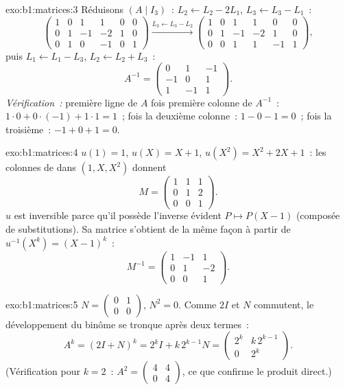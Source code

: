 \begin{solution}{exo:b1:matrices:3}
Réduisons $(A \mid I_3)$~: $L_2 \leftarrow L_2 - 2L_1$, $L_3
\leftarrow L_3 - L_1$~:
\[
\begin{pmatrix}
1 & 0 & 1 & 1 & 0 & 0\\
0 & 1 & -1 & -2 & 1 & 0\\
0 & 1 & 0 & -1 & 0 & 1
\end{pmatrix}
\xrightarrow{L_3 \leftarrow L_3 - L_2}
\begin{pmatrix}
1 & 0 & 1 & 1 & 0 & 0\\
0 & 1 & -1 & -2 & 1 & 0\\
0 & 0 & 1 & 1 & -1 & 1
\end{pmatrix},
\]
puis $L_1 \leftarrow L_1 - L_3$, $L_2 \leftarrow L_2 + L_3$~:
\[
A^{-1} = \begin{pmatrix}
0 & 1 & -1\\
-1 & 0 & 1\\
1 & -1 & 1
\end{pmatrix}.
\]
\emph{Vérification~:} première ligne de $A$ fois première colonne de
$A^{-1}$~: $1 \cdot 0 + 0\cdot(-1) + 1\cdot 1 = 1$~; fois la deuxième
colonne~: $1 - 0 - 1 = 0$~; fois la troisième~: $-1 + 0 + 1 = 0$.
\end{solution}

\begin{solution}{exo:b1:matrices:4}
$u(1) = 1$, $u(X) = X + 1$, $u(X^2) = X^2 + 2X + 1$~: les colonnes de
 dans $(1, X, X^2)$ donnent
\[
M = \begin{pmatrix}
1 & 1 & 1\\
0 & 1 & 2\\
0 & 0 & 1
\end{pmatrix}.
\]
$u$ est inversible parce qu'il possède l'inverse évident $P \mapsto P(X
- 1)$ (composée de substitutions). Sa matrice s'obtient de la même
façon à partir de $u^{-1}(X^k) = (X-1)^k$~:
\[
M^{-1} = \begin{pmatrix}
1 & -1 & 1\\
0 & 1 & -2\\
0 & 0 & 1
\end{pmatrix}.
\]
\end{solution}

\begin{solution}{exo:b1:matrices:5}
$N = \begin{pmatrix} 0 & 1\\ 0 & 0\end{pmatrix}$, $N^2 = 0$. Comme
$2I$ et $N$ commutent, le développement du binôme se tronque après deux
termes~:
\[
A^k = (2I + N)^k = 2^k I + k\,2^{k-1} N
= \begin{pmatrix} 2^k & k\,2^{k-1}\\ 0 & 2^k\end{pmatrix}.
\]
(Vérification pour $k = 2$~: $A^2 = \begin{pmatrix}4 & 4\\ 0 &
4\end{pmatrix}$, ce que confirme le produit direct.)
\end{solution}

